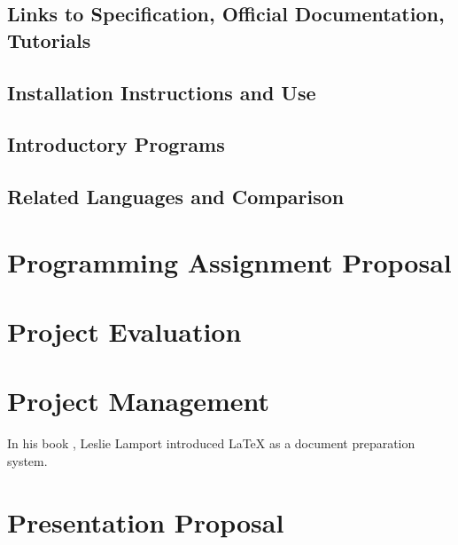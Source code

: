 \documentclass{article}
\begin{document}
\subsection{Links to Specification, Official Documentation, Tutorials}

\subsection{Installation Instructions and Use}

\subsection{Introductory Programs}

\subsection{Related Languages and Comparison}

\section{Programming Assignment Proposal}

\section{Project Evaluation}

\section{Project Management}
In his book \cite{lamport94}, Leslie Lamport introduced LaTeX as a document preparation system.

\section{Presentation Proposal}




\end{document}
